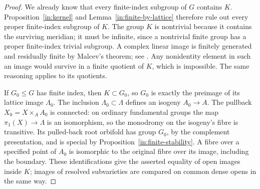 \begin{proof}
We already know that every finite-index subgroup of \(G\)
contains \(K\).  Proposition~\ref{in:kernel} and
Lemma~\ref{in:finite-by-lattice} therefore rule out every proper
finite-index subgroup of \(K\).  The group \(K\) is nontrivial
because it contains the surviving meridian; it must be infinite,
since a nontrivial finite group has a proper finite-index trivial
subgroup.  A complex linear image is finitely generated and
residually finite by Malcev's theorem; see \cite{Nica}.  Any
nonidentity element in such an image would survive in a finite
quotient of \(K\), which is impossible.  The same reasoning
applies to its quotients.

If \(G_0\le G\) has finite index, then \(K\subset G_0\), so
\(G_0\) is exactly the preimage of its lattice image
\(\Lambda_0\).  The inclusion \(\Lambda_0\subset\Lambda\)
defines an isogeny \(A_0\to A\).  The pullback
\(X_0=X\times_A A_0\) is connected: on ordinary fundamental
groups the map \(\pi_1(X)\to\Lambda\) is an isomorphism, so
the monodromy on the isogeny's fibre is transitive.  Its pulled-back
root orbifold has group \(G_0\), by the complement presentation,
and is special by Proposition~\ref{in:finite-stability}.  A fibre
over a specified point of \(A_0\) is isomorphic to the original
fibre over its image, including the boundary.  These identifications
give the asserted equality of open images inside \(K\); images
of resolved subvarieties are compared on common dense opens in
the same way.
\end{proof}
